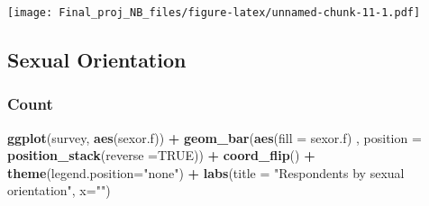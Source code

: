 \documentclass[]{article}
\newenvironment{Shaded}{\begin{snugshade}}{\end{snugshade}}
\newcommand{\KeywordTok}[1]{\textcolor[rgb]{0.13,0.29,0.53}{\textbf{#1}}}
\newcommand{\DataTypeTok}[1]{\textcolor[rgb]{0.13,0.29,0.53}{#1}}
\newcommand{\DecValTok}[1]{\textcolor[rgb]{0.00,0.00,0.81}{#1}}
\newcommand{\StringTok}[1]{\textcolor[rgb]{0.31,0.60,0.02}{#1}}
\newcommand{\OtherTok}[1]{\textcolor[rgb]{0.56,0.35,0.01}{#1}}
\newcommand{\ControlFlowTok}[1]{\textcolor[rgb]{0.13,0.29,0.53}{\textbf{#1}}}
\newcommand{\OperatorTok}[1]{\textcolor[rgb]{0.81,0.36,0.00}{\textbf{#1}}}
\newcommand{\NormalTok}[1]{#1}
\begin{document}
\begin{Shaded}
\end{Shaded}

\texttt{[image: Final\_proj\_NB\_files/figure-latex/unnamed-chunk-11-1.pdf]}

\subsection{Sexual Orientation}\label{sexual-orientation}

\subsubsection{Count}\label{count-2}

\begin{Shaded}
\begin{Highlighting}[]
\KeywordTok{ggplot}\NormalTok{(survey, }\KeywordTok{aes}\NormalTok{(sexor.f)) }\OperatorTok{+}
\StringTok{  }\KeywordTok{geom_bar}\NormalTok{(}\KeywordTok{aes}\NormalTok{(}\DataTypeTok{fill =}\NormalTok{ sexor.f) , }\DataTypeTok{position =} \KeywordTok{position_stack}\NormalTok{(}\DataTypeTok{reverse =}\OtherTok{TRUE}\NormalTok{)) }\OperatorTok{+}
\StringTok{  }\KeywordTok{coord_flip}\NormalTok{() }\OperatorTok{+}\StringTok{ }\KeywordTok{theme}\NormalTok{(}\DataTypeTok{legend.position=}\StringTok{"none"}\NormalTok{) }\OperatorTok{+}\StringTok{ }
\StringTok{  }\KeywordTok{labs}\NormalTok{(}\DataTypeTok{title =} \StringTok{"Respondents by sexual orientation"}\NormalTok{, }\DataTypeTok{x=}\StringTok{""}\NormalTok{)}
\end{Highlighting}
\end{Shaded}
\end{document}
